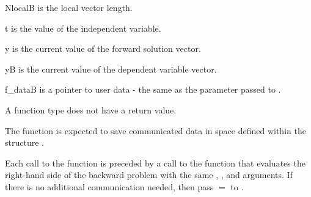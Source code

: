 {
  \begin{args}[NlocalB]
  \item[NlocalB] 
    is the local vector length.
  \item[t]
    is the value of the independent variable.
  \item[y]
    is the current value of the forward solution vector.
  \item[yB]
    is the current value of the dependent variable vector.
  \item[f\_dataB]
    is a pointer to user data - the same as the 
    parameter passed to .
  \end{args}
}
{
  A  function type does not have a return value.
}
{
  The  function is expected to save communicated data in space defined within the
  structure . 

  Each call to the  function is preceded by a call to the function that 
  evaluates the right-hand side of the backward problem with the same , , 
  and  arguments. If there is no additional communication needed, then pass
   $=$  to .
}
